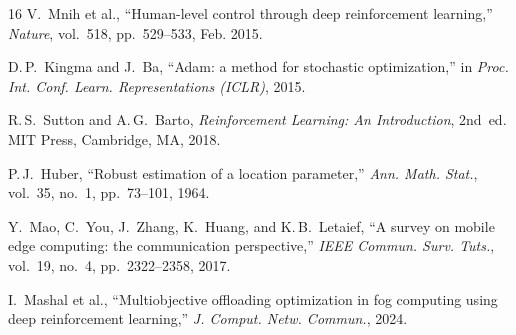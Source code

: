 \documentclass[12pt,a4paper]{article}
\theoremstyle{definition}
\theoremstyle{remark}
\begin{document}
\begin{thebibliography}{16}
V.~Mnih et al.,
``Human-level control through deep reinforcement learning,''
\textit{Nature}, vol.~518, pp.~529--533, Feb. 2015.

D.\,P.~Kingma and J.~Ba,
``Adam: a method for stochastic optimization,''
in \textit{Proc. Int. Conf. Learn. Representations (ICLR)}, 2015.

R.\,S.~Sutton and A.\,G.~Barto,
\textit{Reinforcement Learning: An Introduction}, 2nd~ed.
MIT Press, Cambridge, MA, 2018.

P.\,J.~Huber,
``Robust estimation of a location parameter,''
\textit{Ann. Math. Stat.}, vol.~35, no.~1, pp.~73--101, 1964.

Y.~Mao, C.~You, J.~Zhang, K.~Huang, and K.\,B.~Letaief,
``A survey on mobile edge computing: the communication perspective,''
\textit{IEEE Commun. Surv. Tuts.}, vol.~19, no.~4, pp.~2322--2358, 2017.

I.~Mashal et al.,
``Multiobjective offloading optimization in fog computing using deep
  reinforcement learning,''
\textit{J. Comput. Netw. Commun.}, 2024.

\end{thebibliography}
\end{document}
